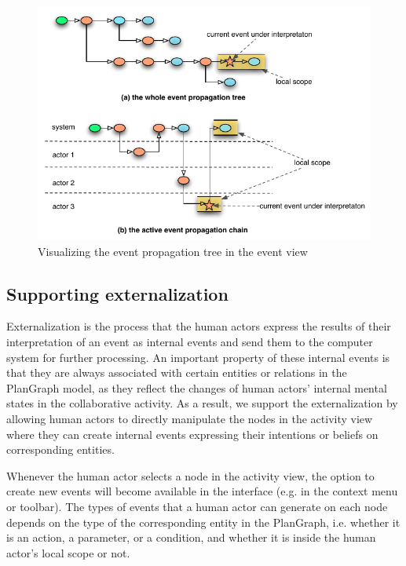 \begin{figure}[htbp] %
	\centering
	\includegraphics{extended_event_view.pdf} 
	\caption{Visualizing the event propagation tree in the event view}
	\label{fig:extended_event_view}
\end{figure}

\subsection{Supporting externalization} %
\label{sub:supporting_externalization}
Externalization is the process that the human actors express the results of their interpretation of an event as internal events and send them to the computer system for further processing. An important property of these internal events is that they are always associated with certain entities or relations in the PlanGraph model, as they reflect the changes of human actors' internal mental states in the collaborative activity. As a result, we support the externalization by allowing human actors to directly manipulate the nodes in the activity view where they can create internal events expressing their intentions or beliefs on corresponding entities.

Whenever the human actor selects a node in the activity view, the option to create new events will become available in the interface (e.g. in the context menu or toolbar). The types of events that a human actor can generate on each node depends on the type of the corresponding entity in the PlanGraph, i.e. whether it is an action, a parameter, or a condition, and whether it is inside the human actor's local scope or not. 

